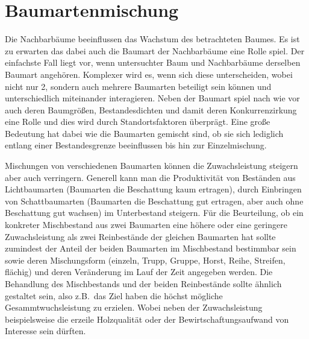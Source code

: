 \documentclass[twocolumn]{scrartcl}
\begin{document}
\section{Baumartenmischung}

Die Nachbarbäume beeinflussen das Wachstum des betrachteten Baumes. Es ist zu
erwarten das dabei auch die Baumart der Nachbarbäume eine Rolle spiel. Der
einfachste Fall liegt vor, wenn untersuchter Baum und Nachbarbäume derselben
Baumart angehören. Komplexer wird es, wenn sich diese unterscheiden, wobei nicht
nur 2, sondern auch mehrere Baumarten beteiligt sein können und unterschiedlich
miteinander interagieren. Neben der Baumart spiel nach wie vor auch deren
Baumgrößen, Bestandesdichten und damit deren Konkurrenzirkung eine Rolle und
dies wird durch Standortsfaktoren überprägt. Eine große Bedeutung hat dabei wie
die Baumarten gemischt sind, ob sie sich lediglich entlang einer Bestandesgrenze
beeinflussen bis hin zur Einzelmischung.

Mischungen von verschiedenen Baumarten können die Zuwachsleistung steigern aber
auch verringern. Generell kann man die Produktivität von Beständen aus
Lichtbaumarten (Baumarten die Beschattung kaum ertragen), durch Einbringen von
Schattbaumarten (Baumarten die Beschattung gut ertragen, aber auch ohne
Beschattung gut wachsen) im Unterbestand steigern. Für die Beurteilung, ob ein
konkreter Mischbestand aus zwei Baumarten eine höhere oder eine geringere
Zuwachsleistung als zwei Reinbestände der gleichen Baumarten hat sollte
zumindest der Anteil der beiden Baumarten im Mischbestand bestimmbar sein sowie
deren Mischungsform (einzeln, Trupp, Gruppe, Horst, Reihe, Streifen, flächig)
und deren Veränderung im Lauf der Zeit angegeben werden. Die Behandlung des
Mischbestands und der beiden Reinbestände sollte ähnlich gestaltet sein, also
z.B.\ das Ziel haben die höchst mögliche Gesammtwuchsleistung zu erzielen. Wobei
neben der Zuwachsleistung beispielsweise die erzeile Holzqualität oder der
Bewirtschaftungsaufwand von Interesse sein dürften.

\renewcommand{\indexname}{Stichwortverzeichnis}
\printindex



\end{document}
